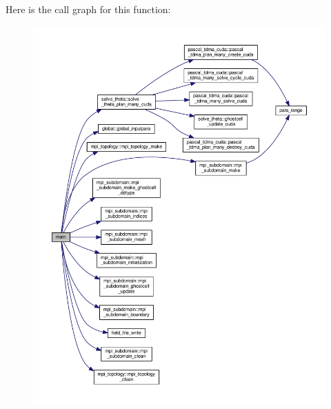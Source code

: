 Here is the call graph for this function\+:
\nopagebreak
\begin{figure}[H]
\begin{center}
\leavevmode
\includegraphics[width=350pt]{main_8f90_a8ec2266d83cd6c0b762cbcbc92c0af3d_cgraph}
\end{center}
\end{figure}
